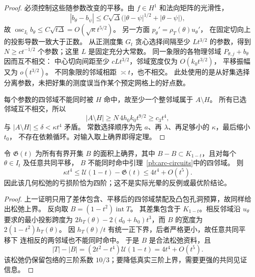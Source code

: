 \begin{proof}
必须控制这些随参数改变的平移。由 $f\in H^1$ 和法向矩阵的光滑性，
\[
 |b_\theta-b_\psi|\le C\sqrt\Delta
 \bigl(|\theta-\psi|^{1/2}+|\theta-\psi|\bigr),
\]
故 $\operatorname{osc}_{I_t}b_\theta\le C\sqrt{t\Delta}=O(\sqrt\kappa t^{5/2})$。
另一方面 $p_\theta'=\rho_T(\theta)u_\theta'$，
在固定切向上的投影导数一致大于正数。
从正测度集 $G_t$ 贪心选择间隔至少 $L t^{3/2}$ 的参数，得到
$N\ge c t^{-1/2}$ 个参数；这里 $L$ 是固定充分大常数。
同一象限的各物理邻域 $P_{\theta,j}+b_\theta$ 因而互不相交：
中心切向间距至少 $cL t^{3/2}$，邻域宽度仅为 $O(k_0t^{3/2})$，
平移振幅又为 $o(t^{3/2})$。
不同象限的邻域相距 $\asymp t$，也不相交。
此处使用的是从好集选择分离参数，未把好集的测度误当作某个预定网格上的好点数。

每个参数的四邻域不能同时被 $H$ 命中，故至少一个整邻域属于 $A\setminus H$。
所有已选邻域互不相交，所以
\[
 |A\setminus H|\ge N\,4h_0k_0t^{9/2}\ge c_3t^4,
\]
与 $|A\setminus H|\le\delta<\kappa t^4$ 矛盾。
常数选择顺序为先 $a$、再 $\lambda$、再足够小的 $\kappa$，最后缩小 $t_0$，
不存在依赖循环。对输入取上确界即得定理。
\end{proof}

\begin{proposition}[连续四邻域松弛的四阶边界]\label{pb:quartic-relaxation}
令 $\mathfrak G(t)$ 为所有有界开集 $B$ 的面积上确界，其中
$B-B\subset K_{1-t}$，且对每个 $\theta\in I_t$ 及任意共同平移，
$B$ 不能同时命中引理~\ref{pb:arc-circuits}中的四邻域。
则
\[
 \kappa t^4\le\mathcal U(1-t)-\mathfrak G(t)\le4t^4+O(t^5).
\]
因此该几何松弛的亏损阶恰为四阶；这不是实际光晕的反例或最优阶结论。
\end{proposition}
\begin{proof}
上一证明只用了差体包含、平移后的四邻域禁配及凸包孔洞预算，故同样给出松弛上界。
反向取 $B=(1-t^2)\operatorname{int}T$。
其差集包含于 $K_{1-t}$。相反邻域沿 $u_\theta$ 要求的最小投影跨度为
$2h_T(\theta)-2(d_0+h_0)t^3$，而 $B$ 的宽度为 $2(1-t^2)h_T(\theta)$。
因 $h_T(\theta)/t$ 有统一正下界，后者严格更小，故任意共同平移下
连相反的两邻域也不能同时命中。
于是 $B$ 是合法松弛资料，且
\[
 |T|-|B|=(2t^2-t^4)\mathcal U(1-t)=4t^4+O(t^5).
\]
该松弛仍保留包络的三阶系数 $10/3$；要降低真实三阶上界，需要更强的共同见证信息。
\end{proof}
